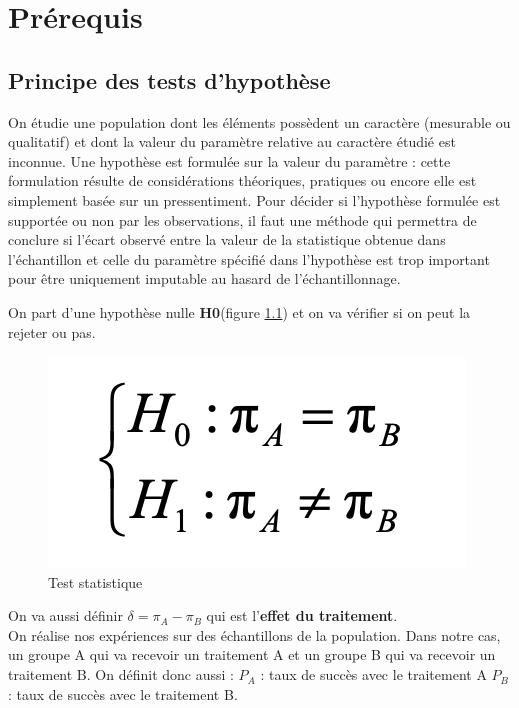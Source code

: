 \chapter{Prérequis}

\section{Principe des tests d’hypothèse}
On  étudie  une  population  dont  les  éléments  possèdent  un  caractère  (mesurable  ou qualitatif) et dont la valeur du paramètre relative au caractère étudié est inconnue. Une  hypothèse  est  formulée  sur  la  valeur  du  paramètre  :  cette  formulation  résulte  de considérations  théoriques,  pratiques  ou  encore  elle  est  simplement  basée  sur  un pressentiment. Pour  décider  si  l’hypothèse  formulée  est  supportée  ou  non  par  les observations,  il  faut  une  méthode  qui  permettra  de  conclure  si  l’écart  observé  entre  la valeur  de  la  statistique  obtenue  dans  l’échantillon  et  celle  du  paramètre  spécifié  dans l’hypothèse  est  trop  important  pour  être  uniquement  imputable  au  hasard  de l’échantillonnage.

On part d'une hypothèse nulle \textbf{H0}(figure \ref{fig:H0}) et on va vérifier si on peut la rejeter ou pas.
\begin{figure}[H]
    \centering
    \includegraphics{images/H0.png}
    \caption{Test statistique}
    \label{fig:H0}
\end{figure}
On va aussi définir $\delta = \pi_{A}-\pi_{B}$ qui est l'\textbf{effet du traitement}.\\
On réalise nos expériences sur des échantillons de la population. Dans notre cas, un groupe A qui va recevoir un traitement A et un groupe B qui va recevoir un traitement B. On définit donc aussi :
$P_{A}$ : taux de succès avec le traitement A 
$P_{B}$ : taux de succès avec le traitement B. 
